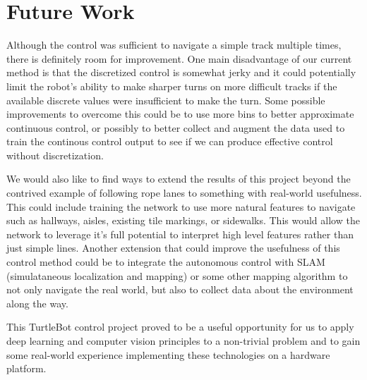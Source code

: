 \section{Future Work}
\label{sec:future_work}
Although the control was sufficient to navigate a simple track multiple times,
there is definitely room for improvement. One main disadvantage of our current
method is that the discretized control is somewhat jerky and it could
potentially limit the robot's ability to make sharper turns on more difficult
tracks if the available discrete values were insufficient to make the turn. Some possible improvements to overcome this could be to use more bins to better approximate continuous control, or possibly to better collect and augment the data used to train the continous control output to see if we can produce effective control without discretization.

We would also like to find ways to extend the results of this project beyond the contrived example of following rope lanes to something with real-world usefulness. This could include training the network to use more natural features to navigate such as hallways, aisles, existing tile markings, or sidewalks. This would allow the network to leverage it's full potential to interpret high level features rather than just simple lines. Another extension that could improve the usefulness of this control method could be to integrate the autonomous control with SLAM (simulataneous localization and mapping) or some other mapping algorithm to not only navigate the real world, but also to collect data about the environment along the way.

This TurtleBot control project proved to be a useful opportunity for us to apply deep learning and computer vision principles to a non-trivial problem and to gain some real-world experience implementing these technologies on a hardware platform.
